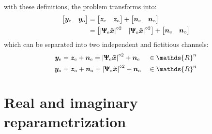 with these definitions, the problem transforms  into:
\begin{align}
	\begin{bmatrix}
		\bm y_\text{e}&\bm y_\text{o}
	\end{bmatrix} &=
	\begin{bmatrix}
		\bm z_\text{e}&\bm z_\text{o}
	\end{bmatrix} +
	\begin{bmatrix}
		\bm n_\text{e}&\bm n_\text{o}
	\end{bmatrix}
	\\&=	
	\begin{bmatrix}
		\left|\bm{ \Uppsi_\text{e} \tilde{x}}\right|^{\circ2}&\left|\bm{ \Uppsi_\text{o} \tilde{x}}\right|^{\circ2}
	\end{bmatrix} +
	\begin{bmatrix}
		\bm n_\text{e}&\bm n_\text{o}
	\end{bmatrix} \\
\end{align}
which can be separated into two independent and fictitious channels:
\begin{align}
	\bm y_\text{e} &= \bm z_\text{e} +\bm n_\text{e}= \left|\bm{ \Uppsi_\text{e} \tilde{x}}\right|^{\circ2}+\bm n_\text{e}&&\in\mathds{R}^n\\
	\bm y_\text{o} &= \bm z_\text{o} +\bm n_\text{o}= \left|\bm{ \Uppsi_\text{o} \tilde{x}}\right|^{\circ2}+\bm n_\text{o}&&\in\mathds{R}^n
\end{align}


\section{Real and imaginary reparametrization}


